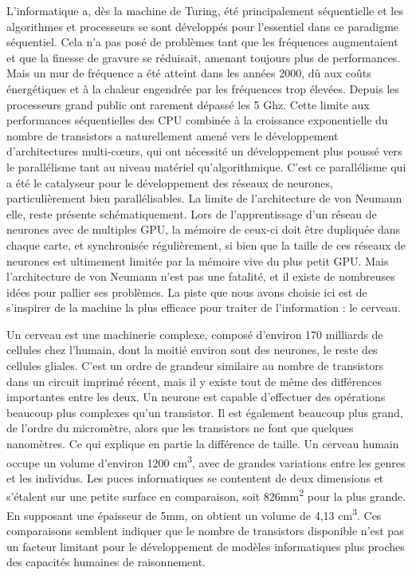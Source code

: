 	L'informatique a, dès la machine de Turing, été principalement séquentielle et les algorithmes et processeurs se sont développés pour l'essentiel dans ce paradigme séquentiel. Cela n'a pas posé de problèmes tant que les fréquences augmentaient et que la finesse de gravure se réduisait, amenant toujours plus de performances. Mais un mur de fréquence a été atteint dans les années 2000, dû aux coûts énergétiques et à la chaleur engendrée par les fréquences trop élevées. Depuis les processeurs grand public ont rarement dépassé les 5 Ghz. Cette limite aux performances séquentielles des CPU combinée à la croissance exponentielle du nombre de transistors a naturellement amené vers le développement d'architectures multi-cœurs, qui ont nécessité un développement plus poussé vers le parallélisme tant au niveau matériel qu'algorithmique. C'est ce parallélisme qui a été le catalyseur pour le développement des réseaux de neurones, particulièrement bien parallélisables. La limite de l'architecture de von Neumann elle, reste présente schématiquement. Lors de l'apprentissage d'un réseau de neurones avec de multiples GPU, la mémoire de ceux-ci doit être dupliquée dans chaque carte, et synchronisée régulièrement, si bien que la taille de ces réseaux de neurones est ultimement limitée par la mémoire vive du plus petit GPU. Mais l'architecture de von Neumann n'est pas une fatalité, et il existe de nombreuses idées pour pallier ses problèmes. La piste que nous avons choisie ici est de s'inspirer de la machine la plus efficace pour traiter de l'information : le cerveau.

	Un cerveau est une machinerie complexe, composé d'environ 170 milliards de cellules chez l'humain, dont la moitié environ sont des neurones, le reste des cellules gliales. C'est un ordre de grandeur similaire au nombre de transistors dans un circuit imprimé récent, mais il y existe tout de même des différences importantes entre les deux. Un neurone est capable d'effectuer des opérations beaucoup plus complexes qu'un transistor. Il est également beaucoup plus grand, de l'ordre du micromètre, alors que les transistors ne font que quelques nanomètres. Ce qui explique en partie la différence de taille. Un cerveau humain occupe un volume d'environ 1200 cm\textsuperscript{3}, avec de grandes variations entre les genres et les individus. Les puces informatiques se contentent de deux dimensions et s'étalent sur une petite surface en comparaison, soit 826mm\textsuperscript{2} pour la plus grande. En supposant une épaisseur de 5mm, on obtient un volume de 4,13 cm\textsuperscript{3}. Ces comparaisons semblent indiquer que le nombre de transistors disponible n'est pas un facteur limitant pour le développement de modèles informatiques plus proches des capacités humaines de raisonnement.

